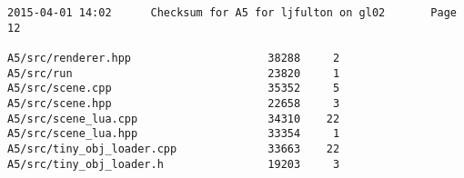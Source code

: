 \documentclass[12pt]{article}
\begin{document}
\begin{verbatim}
2015-04-01 14:02      Checksum for A5 for ljfulton on gl02       Page 12

A5/src/renderer.hpp                     38288     2
A5/src/run                              23820     1
A5/src/scene.cpp                        35352     5
A5/src/scene.hpp                        22658     3
A5/src/scene_lua.cpp                    34310    22
A5/src/scene_lua.hpp                    33354     1
A5/src/tiny_obj_loader.cpp              33663    22
A5/src/tiny_obj_loader.h                19203     3
\end{verbatim}
\end{document}

